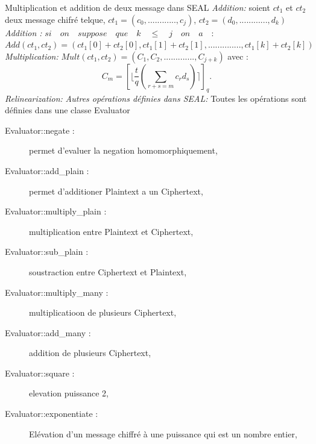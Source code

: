 \documentclass[a4paper,12pt]{report}
\begin{document}
Multiplication et addition de deux message dans SEAL\newline
\textit{Addition:}\newline
soient $ct_1$ et $ct_2$ deux message chifré telque,\newline
$ct_1 = (c_0,............,c_j)$, $ct_2 = (d_0,............,d_k)$
\newline
\textit{Addition : }\newline
\newline
$si\quad on\quad suppose\quad que\quad k\quad \leq \quad j\quad on\quad a \quad:$\newline
\newline
$Add(ct_1, ct_2) = (ct_1[0]+ct_2[0],ct_1[1]+ct_2[1],..............,ct_1[k]+ct_2[k])$\newline
\newline
\textit{Multiplication:}\newline
\newline
$Mult(ct_1, ct_2) = (C_1,C_2,............., C_{j+k})$ avec :\newline
$$C_m = [\lfloor\dfrac{t}{q}(\sum_{r+s=m}^{}c_rd_s)\rceil]_q.$$
\textit{Relinearization:}\newline
\newline
\textit{Autres opérations définies dans SEAL:}\newline
Toutes les opérations sont définies dans une classe Evaluator\newline
\begin{description}
 \item[Evaluator::negate :] permet d'evaluer la negation homomorphiquement,
 \item[Evaluator::add\_plain :] permet d'additioner Plaintext a un Ciphertext,
 \item[Evaluator::multiply\_plain :] multiplication entre Plaintext et Ciphertext,
 \item[Evaluator::sub\_plain :] soustraction entre Ciphertext et Plaintext,
 \item[Evaluator::multiply\_many :] multiplicatioon de plusieurs Ciphertext,
 \item[Evaluator::add\_many :] addition de plusieurs Ciphertext,
 \item[Evaluator::square :] elevation puissance 2,
 \item[Evaluator::exponentiate :] Elévation d'un message chiffré à une puissance qui est un nombre entier,
  \end{description}
\end{document}
